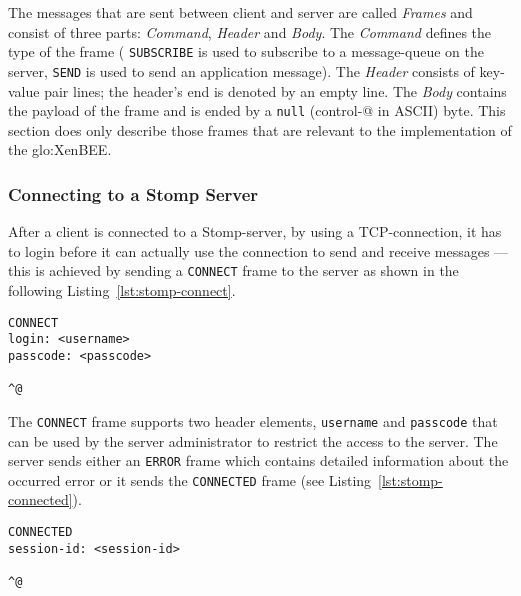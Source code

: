 The  messages  that  are  sent   between  client  and  server  are  called
\emph{Frames}  and consist of  three parts:  \emph{Command}, \emph{Header}
and \emph{Body}.   The \emph{Command} defines  the type of the  frame (\eg
\texttt{SUBSCRIBE} is used to subscribe  to a message-queue on the server,
\texttt{SEND} is  used to send an application  message). The \emph{Header}
consists of key-value pair lines; the  header's end is denoted by an empty
line. The \emph{Body} contains the payload  of the frame and is ended by a
\texttt{null} (control-@  in ASCII) byte. This section  does only describe
those   frames  that   are   relevant  to   the   implementation  of   the
\gls{glo:XenBEE}.

\subsubsection{Connecting to a Stomp Server}

After  a  client   is  connected  to  a  Stomp-server,   \eg  by  using  a
TCP-connection, it has to login  before it can actually use the connection
to  send  and  receive  messages   ---  this  is  achieved  by  sending  a
\texttt{CONNECT}  frame   to  the  server   as  shown  in   the  following
Listing~\ref{lst:stomp-connect}.

\medskip
\begin{center}
  \begin{minipage}{.75\textwidth}
    \begin{lstlisting}[captionpos=b,backgroundcolor=\color{listingcolor},frame=lines,numbers=none,stepnumber=5,numberfirstline=false,numberstyle=\tiny,caption={The initial
      \texttt{CONNECT} message sent by a Stomp client.},label={lst:stomp-connect}]
CONNECT
login: <username>
passcode: <passcode>

^@
    \end{lstlisting}
  \end{minipage}
\end{center}

The \texttt{CONNECT} frame supports two header elements, \texttt{username}
and  \texttt{passcode} that  can be  used by  the server  administrator to
restrict  the  access   to  the  server.   The  server   sends  either  an
\texttt{ERROR}  frame  which   contains  detailed  information  about  the
occurred   error   or  it   sends   the   \texttt{CONNECTED}  frame   (see
Listing~\ref{lst:stomp-connected}).

\medskip
\begin{center}
  \begin{minipage}{.75\textwidth}
    \begin{lstlisting}[captionpos=b,backgroundcolor=\color{listingcolor},frame=lines,numbers=none,stepnumber=5,numberfirstline=false,numberstyle=\tiny,caption={The
        \texttt{CONNECTED} message sent by a Stomp server after a client
        has successfully logged in.},label={lst:stomp-connected}]
CONNECTED
session-id: <session-id>

^@
    \end{lstlisting}
  \end{minipage}
\end{center}

